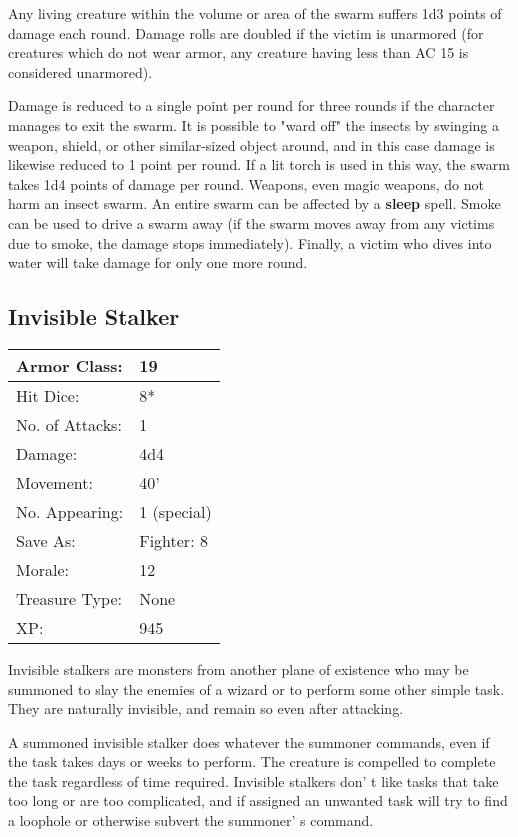 \documentclass[a4paper,twoside,openany,10pt]{book}
\begin{document}
\begin{multicols}{2}
Any living creature within the volume or area of the swarm suffers 1d3 points of damage each round. Damage rolls are doubled if the victim is unarmored (for creatures which do not wear armor, any creature having less than AC 15 is considered unarmored). 

Damage is reduced to a single point per round for three rounds if the character manages to exit the swarm. It is possible to "ward off" the insects by swinging a weapon, shield, or other similar-sized object around, and in this case damage is likewise reduced to 1 point per round. If a lit torch is used in this way, the swarm takes 1d4 points of damage per round. Weapons, even magic weapons, do not harm an insect swarm. An entire swarm can be affected by a \textbf{sleep} spell. Smoke can be used to drive a swarm away (if the swarm moves away from any victims due to smoke, the damage stops immediately). Finally, a victim who dives into water will take damage for only one more round.

\subsection*{Invisible Stalker}\label{invisible-stalker}

\begin{tabularx}{0.50\textwidth}{@{}lX@{}}
Armor Class: & 19 \\\hline
Hit Dice: & 8* \\\hline
No. of Attacks: & 1 \\\hline
Damage: & 4d4 \\\hline
Movement: & 40' \\\hline
No. Appearing: & 1 (special) \\\hline
Save As: & Fighter: 8 \\\hline
Morale: & 12 \\\hline
Treasure Type: & None \\\hline
XP: & 945 \\\hline
\end{tabularx}

Invisible stalkers are monsters from another plane of existence who may be summoned to slay the enemies of a wizard or to perform some other simple task. They are naturally invisible, and remain so even after attacking. 

A summoned invisible stalker does whatever the summoner commands, even if the task takes days or weeks to perform. The creature is compelled to complete the task regardless of time required. Invisible stalkers don' t like tasks that take too long or are too complicated, and if assigned an unwanted task will try to find a loophole or otherwise subvert the summoner' s command.


\end{multicols}
\end{document}
